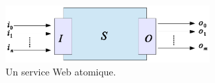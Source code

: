 \begin{figure}[h]
    \centering
    \includegraphics[width=0.7\textwidth]{figs/ch4/web-service.eps}
    \caption{Un service Web atomique.}
    \label{fig:ch4/web-service}
\end{figure}
